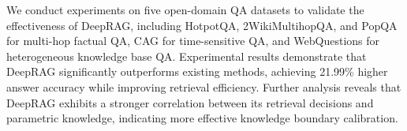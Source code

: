 



We conduct experiments on five open-domain QA datasets to validate the effectiveness of DeepRAG, including HotpotQA, 2WikiMultihopQA, and PopQA for multi-hop factual QA, CAG for time-sensitive QA, and WebQuestions for heterogeneous knowledge base QA.
% 
Experimental results demonstrate that DeepRAG significantly outperforms existing methods, achieving 21.99\% higher answer accuracy while improving retrieval efficiency.
Further analysis reveals that DeepRAG exhibits a stronger correlation between its retrieval decisions and parametric knowledge, indicating more effective knowledge boundary calibration.
 

